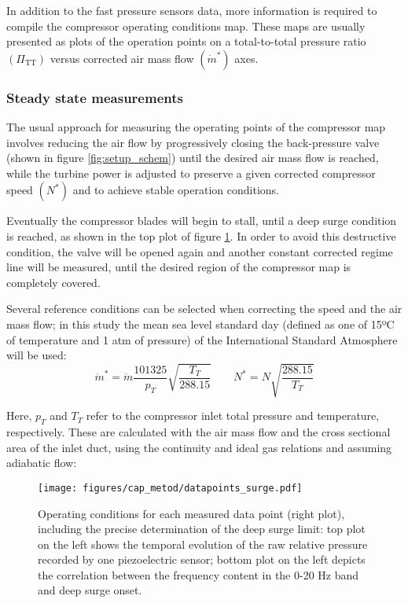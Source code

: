 In addition to the fast pressure sensors data, more information is required to compile the compressor operating conditions map. These maps are usually presented as plots of the operation points on a total-to-total pressure ratio $(\Pi_\text{TT})$ versus corrected air mass flow $(\dot m^*)$ axes.

\subsubsection{Steady state measurements}
\label{sub:steady_state_measurements}

The usual approach for measuring the operating points of the compressor map involves reducing the air flow by progressively closing the back-pressure valve (shown in figure \ref{fig:setup_schem}) until the desired air mass flow is reached, while the turbine power is adjusted to preserve a given corrected compressor speed $(N^*)$ and to achieve stable operation conditions.

Eventually the compressor blades will begin to stall, until a deep surge condition is reached, as shown in the top plot of figure \ref{fig:surge_datapoints}. In order to avoid this destructive condition, the valve will be opened again and another constant corrected regime line will be measured, until the desired region of the compressor map is completely covered.

Several reference conditions can be selected when correcting the speed and the air mass flow; in this study the mean sea level standard day (defined as one of 15ºC of temperature and 1 atm of pressure) of the International Standard Atmosphere will be used:
\begin{equation}
    \dot m^* = \dot m\frac{101325}{p_{T}}\sqrt{\frac{T_{T}}{288.15}}
    \qquad N^*=N\sqrt{\frac{288.15}{T_{T}}}
\end{equation}

Here, $p_{T}$ and $T_{T}$ refer to the compressor inlet total pressure and temperature, respectively. These are calculated with the air mass flow and the cross sectional area of the inlet duct, using the continuity and ideal gas relations and assuming adiabatic flow:

\begin{figure}[bthp!]
\centering
\texttt{[image: figures/cap\_metod/datapoints\_surge.pdf]}
\caption{Operating conditions for each measured data point (right plot), including the precise determination of the deep surge limit: top plot on the left shows the temporal evolution of the raw relative pressure recorded by one piezoelectric sensor; bottom plot on the left depicts the correlation between the frequency content in the 0-20 Hz band and deep surge onset.}
\label{fig:surge_datapoints}
\end{figure}

